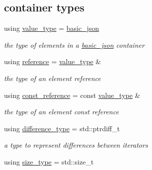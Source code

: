 \subsection*{container types}
\begin{DoxyCompactItemize}
\item 
using \hyperlink{a00025_ac8d45b57874b4a6e9c07f7d3b5daa1f9}{value\+\_\+type} = \hyperlink{a00025}{basic\+\_\+json}\hypertarget{a00025_ac8d45b57874b4a6e9c07f7d3b5daa1f9}{}\label{a00025_ac8d45b57874b4a6e9c07f7d3b5daa1f9}

\begin{DoxyCompactList}\small\item\em the type of elements in a \hyperlink{a00025}{basic\+\_\+json} container \end{DoxyCompactList}\item 
using \hyperlink{a00025_a3ec8e17be8732fe436e9d6733f52b7a3}{reference} = \hyperlink{a00025_ac8d45b57874b4a6e9c07f7d3b5daa1f9}{value\+\_\+type} \&\hypertarget{a00025_a3ec8e17be8732fe436e9d6733f52b7a3}{}\label{a00025_a3ec8e17be8732fe436e9d6733f52b7a3}

\begin{DoxyCompactList}\small\item\em the type of an element reference \end{DoxyCompactList}\item 
using \hyperlink{a00025_af677a29b0e66edc9f66e5167e4667071}{const\+\_\+reference} = const \hyperlink{a00025_ac8d45b57874b4a6e9c07f7d3b5daa1f9}{value\+\_\+type} \&\hypertarget{a00025_af677a29b0e66edc9f66e5167e4667071}{}\label{a00025_af677a29b0e66edc9f66e5167e4667071}

\begin{DoxyCompactList}\small\item\em the type of an element const reference \end{DoxyCompactList}\item 
using \hyperlink{a00025_aec316934a555dd1acdd3600e5d4a4cdf}{difference\+\_\+type} = std\+::ptrdiff\+\_\+t\hypertarget{a00025_aec316934a555dd1acdd3600e5d4a4cdf}{}\label{a00025_aec316934a555dd1acdd3600e5d4a4cdf}

\begin{DoxyCompactList}\small\item\em a type to represent differences between iterators \end{DoxyCompactList}\item 
using \hyperlink{a00025_a1579a8f72a230358d6cd1a6e8a62859b}{size\+\_\+type} = std\+::size\+\_\+t\hypertarget{a00025_a1579a8f72a230358d6cd1a6e8a62859b}{}\label{a00025_a1579a8f72a230358d6cd1a6e8a62859b}


\end{DoxyCompactItemize}
